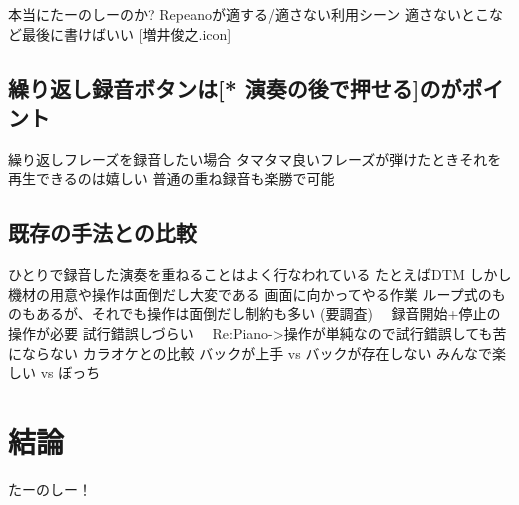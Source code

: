 \documentclass[submit,techreq]{ec2017}
\begin{document}
 本当にたーのしーのか?
 Repeanoが適する/適さない利用シーン
  適さないとこなど最後に書けばいい [増井俊之.icon]
\subsection{繰り返し録音ボタンは[* 演奏の後で押せる]のがポイント}
  繰り返しフレーズを録音したい場合
  タマタマ良いフレーズが弾けたときそれを再生できるのは嬉しい
 普通の重ね録音も楽勝で可能
\subsection{既存の手法との比較}
  ひとりで録音した演奏を重ねることはよく行なわれている
   たとえばDTM
  しかし機材の用意や操作は面倒だし大変である
   画面に向かってやる作業
  ループ式のものもあるが、それでも操作は面倒だし制約も多い (要調査)
  　録音開始+停止の操作が必要
  	試行錯誤しづらい
   　Re:Piano->操作が単純なので試行錯誤しても苦にならない
 カラオケとの比較
  バックが上手 vs バックが存在しない
  みんなで楽しい vs ぼっち
  
\section{結論}

たーのしー！






\end{document}
